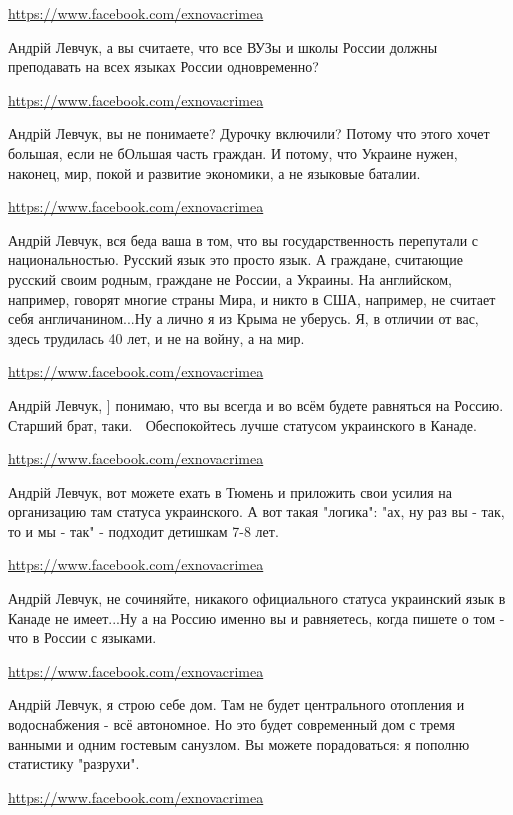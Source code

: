 \documentclass[a4paper,11pt]{extreport}
\begin{document}
\begin{itemize}
\begin{itemize}
\url{https://www.facebook.com/exnovacrimea}

Андрій Левчук, а вы считаете, что все ВУЗы и школы России должны преподавать на всех языках России одновременно?

\url{https://www.facebook.com/exnovacrimea}

Андрій Левчук, вы не понимаете? Дурочку включили? Потому что этого хочет большая, если не бОльшая часть граждан. И потому, что Украине нужен, наконец, мир, покой и развитие экономики, а не языковые баталии.

\url{https://www.facebook.com/exnovacrimea}

Андрій Левчук, вся беда ваша в том, что вы государственность перепутали с национальностью. Русский язык это просто язык. А граждане, считающие русский своим родным, граждане не России, а Украины. На английском, например, говорят многие страны Мира, и никто в США, например, не считает себя англичанином...Ну а лично я из Крыма не уберусь. Я, в отличии от вас, здесь трудилась 40 лет, и не на войну, а на мир.

\url{https://www.facebook.com/exnovacrimea}

Андрій Левчук, ] понимаю, что вы всегда и во всём будете равняться на Россию. Старший брат, таки. 🤣 Обеспокойтесь лучше статусом украинского в Канаде.

\url{https://www.facebook.com/exnovacrimea}

Андрій Левчук, вот можете ехать в Тюмень и приложить свои усилия на организацию там статуса украинского. А вот такая "логика": "ах, ну раз вы - так, то и мы - так" - подходит детишкам 7-8 лет.

\url{https://www.facebook.com/exnovacrimea}

Андрій Левчук, не сочиняйте, никакого официального статуса украинский язык в Канаде не имеет...Ну а на Россию именно вы и равняетесь, когда пишете о том - что в России с языками.

\url{https://www.facebook.com/exnovacrimea}

Андрій Левчук, я строю себе дом. Там не будет центрального отопления и водоснабжения - всё автономное. Но это будет современный дом с тремя ванными и одним гостевым санузлом. Вы можете порадоваться: я пополню статистику "разрухи". 🤣

\url{https://www.facebook.com/exnovacrimea}


\end{itemize}
\end{itemize}
\end{document}
